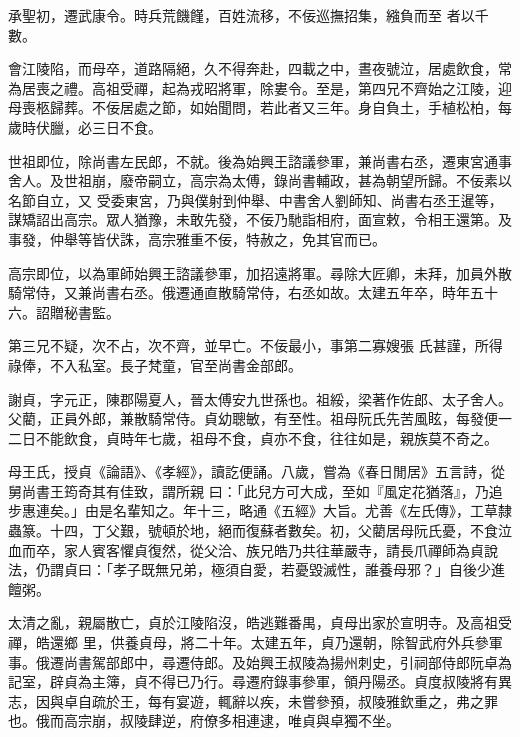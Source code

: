 \begin{pinyinscope}
 承聖初，遷武康令。時兵荒饑饉，百姓流移，不佞巡撫招集，繈負而至
 者以千數。



 會江陵陷，而母卒，道路隔絕，久不得奔赴，四載之中，晝夜號泣，居處飲食，常為居喪之禮。高祖受禪，起為戎昭將軍，除婁令。至是，第四兄不齊始之江陵，迎母喪柩歸葬。不佞居處之節，如始聞問，若此者又三年。身自負土，手植松柏，每歲時伏臘，必三日不食。



 世祖即位，除尚書左民郎，不就。後為始興王諮議參軍，兼尚書右丞，遷東宮通事舍人。及世祖崩，廢帝嗣立，高宗為太傅，錄尚書輔政，甚為朝望所歸。不佞素以名節自立，又
 受委東宮，乃與僕射到仲舉、中書舍人劉師知、尚書右丞王暹等，謀矯詔出高宗。眾人猶豫，未敢先發，不佞乃馳詣相府，面宣敕，令相王還第。及事發，仲舉等皆伏誅，高宗雅重不佞，特赦之，免其官而已。



 高宗即位，以為軍師始興王諮議參軍，加招遠將軍。尋除大匠卿，未拜，加員外散騎常侍，又兼尚書右丞。俄遷通直散騎常侍，右丞如故。太建五年卒，時年五十六。詔贈秘書監。



 第三兄不疑，次不占，次不齊，並早亡。不佞最小，事第二寡嫂張
 氏甚謹，所得祿俸，不入私室。長子梵童，官至尚書金部郎。



 謝貞，字元正，陳郡陽夏人，晉太傅安九世孫也。祖綏，梁著作佐郎、太子舍人。父藺，正員外郎，兼散騎常侍。貞幼聰敏，有至性。祖母阮氏先苦風眩，每發便一二日不能飲食，貞時年七歲，祖母不食，貞亦不食，往往如是，親族莫不奇之。



 母王氏，授貞《論語》、《孝經》，讀訖便誦。八歲，嘗為《春日閒居》五言詩，從舅尚書王筠奇其有佳致，謂所親
 曰：「此兒方可大成，至如『風定花猶落』，乃追步惠連矣。」由是名輩知之。年十三，略通《五經》大旨。尤善《左氏傳》，工草隸蟲篆。十四，丁父艱，號頓於地，絕而復蘇者數矣。初，父藺居母阮氏憂，不食泣血而卒，家人賓客懼貞復然，從父洽、族兄皓乃共往華嚴寺，請長爪禪師為貞說法，仍謂貞曰：「孝子既無兄弟，極須自愛，若憂毀滅性，誰養母邪？」自後少進饘粥。



 太清之亂，親屬散亡，貞於江陵陷沒，皓逃難番禺，貞母出家於宣明寺。及高祖受禪，皓還鄉
 里，供養貞母，將二十年。太建五年，貞乃還朝，除智武府外兵參軍事。俄遷尚書駕部郎中，尋遷侍郎。及始興王叔陵為揚州刺史，引祠部侍郎阮卓為記室，辟貞為主簿，貞不得已乃行。尋遷府錄事參軍，領丹陽丞。貞度叔陵將有異志，因與卓自疏於王，每有宴遊，輒辭以疾，未嘗參預，叔陵雅欽重之，弗之罪也。俄而高宗崩，叔陵肆逆，府僚多相連逮，唯貞與卓獨不坐。




\end{pinyinscope}

